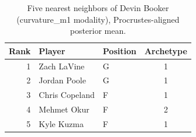 \begin{table}[htbp]
  \centering\small
  \begin{tabular}{rllc}
    \toprule
    Rank & Player & Position & Archetype \\
    \midrule
    1 & Zach LaVine & G & 1 \\
    2 & Jordan Poole & G & 1 \\
    3 & Chris Copeland & F & 1 \\
    4 & Mehmet Okur & F & 2 \\
    5 & Kyle Kuzma & F & 1 \\
    \bottomrule
  \end{tabular}
  \caption{Five nearest neighbors of Devin Booker (curvature_m1 modality), Procrustes-aligned posterior mean.}
  \label{tab:Devin_Booker_neighbors_curvature_m1}
\end{table}

